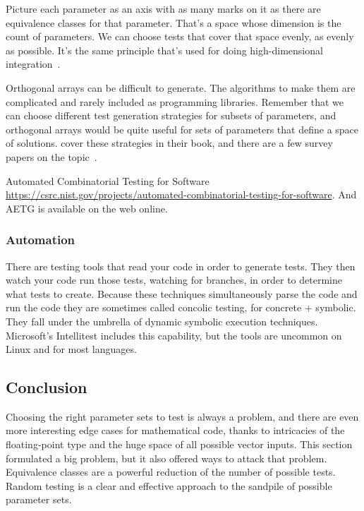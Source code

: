 \documentclass[fleqn,10pt]{olplainarticle}
\begin{document}
Picture each parameter as an axis with as many marks
on it as there are equivalence classes for that parameter.
That's a space whose dimension is the count of parameters.
We can choose tests that cover that space evenly, as evenly
as possible. It's the same principle that's used for doing
high-dimensional integration~\citep{Owen1992}.

Orthogonal arrays can
be difficult to generate. The algorithms to make them
are complicated and rarely included as programming libraries.
Remember that we can choose different test generation strategies
for subsets of parameters, and orthogonal arrays would be
quite useful for sets of parameters that define a space of
solutions.
\citet{petke2015practical} cover these strategies in their book,
and there are a few survey papers on the topic~\citep{grindal2005,nie2011survey,khalsa2014orchestrated}.

Automated Combinatorial Testing for Software
\url{https://csrc.nist.gov/projects/automated-combinatorial-testing-for-software}.
And AETG is available on the web online.

\subsubsection{Automation}

There are testing tools that read your code in order to
generate tests. They then watch your code run those tests,
watching for branches, in order to determine what tests
to create. Because these techniques simultaneously parse the
code and run the code they are sometimes called concolic testing,
for concrete + symbolic. They fall under the umbrella of
dynamic symbolic execution techniques. Microsoft's Intellitest
includes this capability, but the tools are uncommon on
Linux and for most languages.


\subsection{Conclusion}

Choosing the right parameter sets to test is always a problem,
and there are even more interesting edge cases for mathematical
code, thanks to intricacies of the floating-point type and 
the huge space of all possible vector inputs. This section
formulated a big problem, but it also offered ways to attack
that problem. Equivalence classes are a powerful reduction of
the number of possible tests. Random testing is a clear and
effective approach to the sandpile of possible parameter sets.
\end{document}
